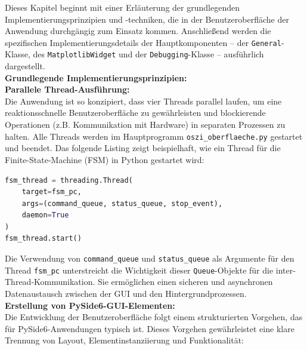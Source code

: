 \documentclass[a4paper, portrait, 12pt]{scrartcl} %
\begin{document}
Dieses Kapitel beginnt mit einer Erläuterung der grundlegenden Implementierungsprinzipien und -techniken, die in der Benutzeroberfläche der Anwendung durchgängig zum Einsatz kommen. Anschließend werden die spezifischen Implementierungsdetails der Hauptkomponenten – der \texttt{General}-Klasse, des \texttt{MatplotlibWidget} und der \texttt{Debugging}-Klasse – ausführlich dargestellt.\\

\textbf{Grundlegende Implementierungsprinzipien:}\\

\textbf{Parallele Thread-Ausführung:}\\
Die Anwendung ist so konzipiert, dass vier Threads parallel laufen, um eine reaktionsschnelle Benutzeroberfläche zu gewährleisten und blockierende Operationen (z.B. Kommunikation mit Hardware) in separaten Prozessen zu halten. Alle Threads werden im Hauptprogramm \texttt{oszi\_oberflaeche.py} gestartet und beendet. Das folgende Listing zeigt beispielhaft, wie ein Thread für die Finite-State-Machine (FSM) in Python gestartet wird:

\begin{lstlisting}[language=Python, caption={Starten eines Threads in Python}, label={lst:thread_start}]
fsm_thread = threading.Thread(
    target=fsm_pc,
    args=(command_queue, status_queue, stop_event),
    daemon=True
)
fsm_thread.start()
\end{lstlisting}

Die Verwendung von \texttt{command\_queue} und \texttt{status\_queue} als Argumente für den Thread \texttt{fsm\_pc} unterstreicht die Wichtigkeit dieser \texttt{Queue}-Objekte für die inter-Thread-Kommunikation. Sie ermöglichen einen sicheren und asynchronen Datenaustausch zwischen der GUI und den Hintergrundprozessen.\\

\textbf{Erstellung von PySide6-GUI-Elementen:}\\
Die Entwicklung der Benutzeroberfläche folgt einem strukturierten Vorgehen, das für PySide6-Anwendungen typisch ist. Dieses Vorgehen gewährleistet eine klare Trennung von Layout, Elementinstanziierung und Funktionalität:
\end{document}

